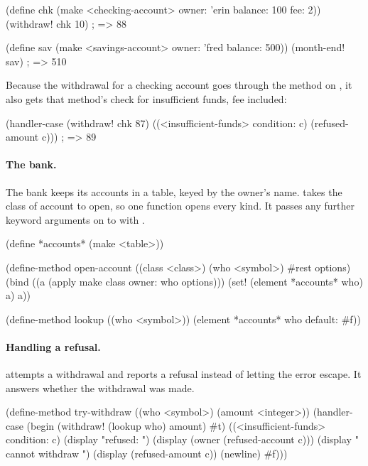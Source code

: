 \begin{dylan}
(define chk (make <checking-account> owner: 'erin balance: 100 fee: 2))
(withdraw! chk 10)              ; => 88

(define sav (make <savings-account> owner: 'fred balance: 500))
(month-end! sav)                ; => 510
\end{dylan}

Because the withdrawal for a checking account goes through the method on
, it also gets that method's check for insufficient
funds, fee included:

\begin{dylan}
(handler-case (withdraw! chk 87)
  ((<insufficient-funds> condition: c)
   (refused-amount c)))         ; => 89
\end{dylan}

\paragraph{The bank.} The bank keeps its accounts in a table, keyed by
the owner's name.  takes the class of account to open,
so one function opens every kind. It passes any further keyword arguments
on to  with .

\begin{dylan}
(define *accounts* (make <table>))

(define-method open-account ((class <class>) (who <symbol>) #rest options)
  (bind ((a (apply make class owner: who options)))
    (set! (element *accounts* who) a)
    a))

(define-method lookup ((who <symbol>))
  (element *accounts* who default: #f))
\end{dylan}

\paragraph{Handling a refusal.}  attempts a withdrawal
and reports a refusal instead of letting the error escape. It answers
whether the withdrawal was made.

\begin{dylan}
(define-method try-withdraw ((who <symbol>) (amount <integer>))
  (handler-case (begin (withdraw! (lookup who) amount) #t)
    ((<insufficient-funds> condition: c)
     (display "refused: ")
     (display (owner (refused-account c)))
     (display " cannot withdraw ")
     (display (refused-amount c))
     (newline)
     #f)))
\end{dylan}

